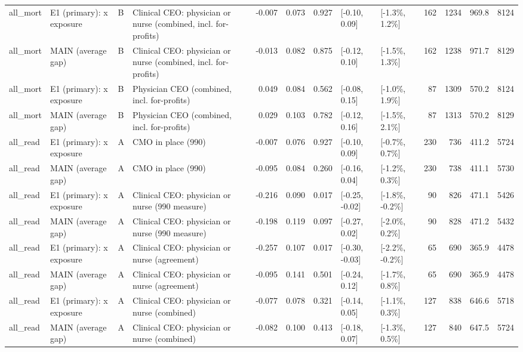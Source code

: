 \begin{tabular}{llllrrrllrrrr}
all\_mort & E1 (primary): x exposure & B & Clinical CEO: physician or nurse (combined, incl. for-profits) & -0.007 & 0.073 & 0.927 & {}[-0.10, 0.09] & {}[-1.3\%, 1.2\%] & 162 & 1234 & 969.8 & 8124\\
\addlinespace
all\_mort & MAIN (average gap) & B & Clinical CEO: physician or nurse (combined, incl. for-profits) & -0.013 & 0.082 & 0.875 & {}[-0.12, 0.10] & {}[-1.5\%, 1.3\%] & 162 & 1238 & 971.7 & 8129\\
all\_mort & E1 (primary): x exposure & B & Physician CEO (combined, incl. for-profits) & 0.049 & 0.084 & 0.562 & {}[-0.08, 0.15] & {}[-1.0\%, 1.9\%] & 87 & 1309 & 570.2 & 8124\\
all\_mort & MAIN (average gap) & B & Physician CEO (combined, incl. for-profits) & 0.029 & 0.103 & 0.782 & {}[-0.12, 0.16] & {}[-1.5\%, 2.1\%] & 87 & 1313 & 570.2 & 8129\\
all\_read & E1 (primary): x exposure & A & CMO in place (990) & -0.007 & 0.076 & 0.927 & {}[-0.10, 0.09] & {}[-0.7\%, 0.7\%] & 230 & 736 & 411.2 & 5724\\
all\_read & MAIN (average gap) & A & CMO in place (990) & -0.095 & 0.084 & 0.260 & {}[-0.16, 0.04] & {}[-1.2\%, 0.3\%] & 230 & 738 & 411.1 & 5730\\
\addlinespace
all\_read & E1 (primary): x exposure & A & Clinical CEO: physician or nurse (990 measure) & -0.216 & 0.090 & 0.017 & {}[-0.25, -0.02] & {}[-1.8\%, -0.2\%] & 90 & 826 & 471.1 & 5426\\
all\_read & MAIN (average gap) & A & Clinical CEO: physician or nurse (990 measure) & -0.198 & 0.119 & 0.097 & {}[-0.27, 0.02] & {}[-2.0\%, 0.2\%] & 90 & 828 & 471.2 & 5432\\
all\_read & E1 (primary): x exposure & A & Clinical CEO: physician or nurse (agreement) & -0.257 & 0.107 & 0.017 & {}[-0.30, -0.03] & {}[-2.2\%, -0.2\%] & 65 & 690 & 365.9 & 4478\\
all\_read & MAIN (average gap) & A & Clinical CEO: physician or nurse (agreement) & -0.095 & 0.141 & 0.501 & {}[-0.24, 0.12] & {}[-1.7\%, 0.8\%] & 65 & 690 & 365.9 & 4478\\
all\_read & E1 (primary): x exposure & A & Clinical CEO: physician or nurse (combined) & -0.077 & 0.078 & 0.321 & {}[-0.14, 0.05] & {}[-1.1\%, 0.3\%] & 127 & 838 & 646.6 & 5718\\
\addlinespace
all\_read & MAIN (average gap) & A & Clinical CEO: physician or nurse (combined) & -0.082 & 0.100 & 0.413 & {}[-0.18, 0.07] & {}[-1.3\%, 0.5\%] & 127 & 840 & 647.5 & 5724\\

\end{tabular}
